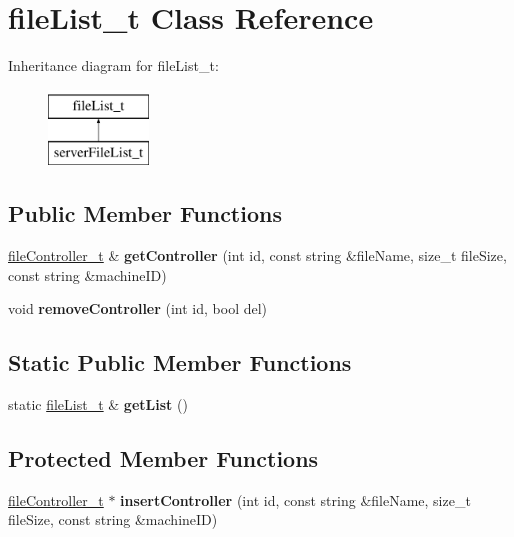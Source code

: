 \hypertarget{classfileList__t}{\section{file\-List\-\_\-t \-Class \-Reference}
\label{classfileList__t}
}
\-Inheritance diagram for file\-List\-\_\-t\-:\begin{figure}[H]
\begin{center}
\leavevmode
\includegraphics[height=2.000000cm]{classfileList__t}
\end{center}
\end{figure}
\subsection*{\-Public \-Member \-Functions}
\begin{DoxyCompactItemize}
\item 
\hypertarget{classfileList__t_a8fba3a22543574a4a42b620899649a25}{\hyperlink{classfileController__t}{file\-Controller\-\_\-t} \& {\bfseries get\-Controller} (int id, const string \&file\-Name, size\-\_\-t file\-Size, const string \&machine\-I\-D)}\label{classfileList__t_a8fba3a22543574a4a42b620899649a25}

\item 
\hypertarget{classfileList__t_a170a9fdb91e103f6486b31511839acd5}{void {\bfseries remove\-Controller} (int id, bool del)}\label{classfileList__t_a170a9fdb91e103f6486b31511839acd5}

\end{DoxyCompactItemize}
\subsection*{\-Static \-Public \-Member \-Functions}
\begin{DoxyCompactItemize}
\item 
\hypertarget{classfileList__t_a7e9641ed9a17ff4af71b6e8b27642541}{static \hyperlink{classfileList__t}{file\-List\-\_\-t} \& {\bfseries get\-List} ()}\label{classfileList__t_a7e9641ed9a17ff4af71b6e8b27642541}

\end{DoxyCompactItemize}
\subsection*{\-Protected \-Member \-Functions}
\begin{DoxyCompactItemize}
\item 
\hypertarget{classfileList__t_a037ed8edf774ccac733c578ac49ae41d}{\hyperlink{classfileController__t}{file\-Controller\-\_\-t} $\ast$ {\bfseries insert\-Controller} (int id, const string \&file\-Name, size\-\_\-t file\-Size, const string \&machine\-I\-D)}\label{classfileList__t_a037ed8edf774ccac733c578ac49ae41d}

\end{DoxyCompactItemize}
